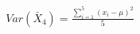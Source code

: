 \documentclass[preview]{standalone}
\begin{document}
\begin{align*}
Var(\bar{X}_4) = \frac{\sum_{i=1}^{5}(x_i - \mu)^2}{5}
\end{align*}
\end{document}
